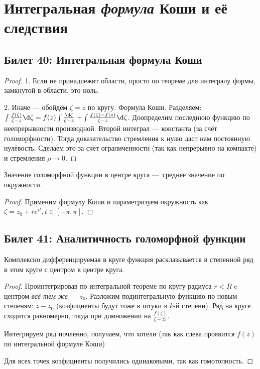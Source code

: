 \documentclass[12pt, a4paper, oneside]{memoir}
\begin{document}
\section{Интегральная \textit{формула} Коши и её следствия}

\subsection{Билет 40: Интегральная формула Коши}

\begin{theorem}

    \begin{proof}
        1. Если не принадлежит области, просто по теореме для интегралу формы, замкнутой в области, это ноль.

        2. Иначе — обойдём $\zeta = z$ по кругу. Формула Коши. Разделяем: $\int \frac{f(\zeta)}{\zeta - z} \d \zeta = f(z) \int \frac{\d \zeta}{\zeta - z} + \int \frac{f(\zeta) - f(z)}{\zeta - z} \d \zeta$. Доопределим последнюю функцию по неепрерывности производной.
        Второй интеграл — константа (за счёт голоморфности). Тогда доказательство стремления к нулю даст нам постоянную нулёвость. Сделаем это за счёт ограниченности (так как непрерывно на компакте) и стремления $\rho → 0$.
    \end{proof}
\end{theorem}

\begin{corollary}
     Значение голоморфной функции в центре круга — среднее значение по окружности.

    \begin{proof}
        Применим формулу Коши и параметризуем окружность как $\zeta = z_0 + re^{it}, t \in [-\pi, \pi]$.
    \end{proof}
\end{corollary}

\subsection{Билет 41: Аналитичность голоморфной функции}

\begin{theorem}
    Комплексно дифференцируемая в круге функция 
    расклазывается в степенной ряд в этом круге
    с центром в центре круга.

    \begin{proof}
        Проинтегрировав по интегральной теореме по кругу радиуса $r < R$ c центром \textit{всё тем же} — $z_0$. Разложим подинтегральную функцию по новым степеням: $z - z_0$ (коэфициенты будут тоже в штуки в $k$-й степени).
        Ряд на круге сходится равномерно, тогда при домножении на $\frac{f(\zeta)}{\zeta - z_0}$.

        Интегрируем ряд почленно, получаем, что хотели (так как слева проявится $f(z)$ по интегральной формуле Коши)
        
        Для всех точек коэфициенты получились одинаковыми, так как гомотопность.
    \end{proof}
\end{theorem}
\end{document}
